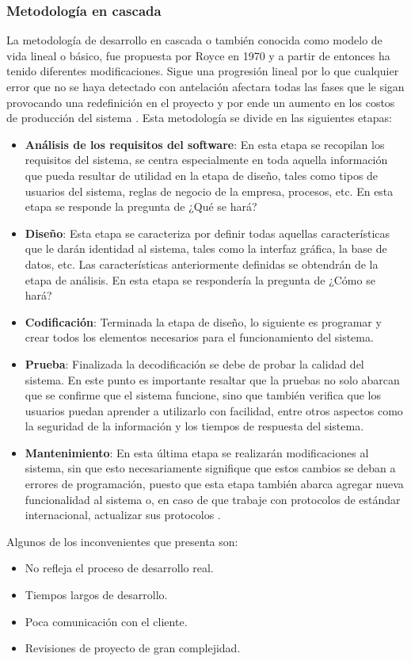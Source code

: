 			\subsubsection{Metodología en cascada}
La metodología de desarrollo en cascada o también conocida como modelo de vida lineal o básico,  fue propuesta por Royce en 1970 y a partir de entonces ha tenido diferentes modificaciones. Sigue una progresión lineal por lo que cualquier error que no se haya detectado con antelación afectara todas las fases que le sigan provocando una redefinición en el proyecto y por ende un aumento en los costos de producción del sistema \cite{Ref:CarCascada}.
Esta metodología se divide en las siguientes etapas:
\begin{itemize}
	\item \textbf{Análisis de los requisitos del software}: En esta etapa se recopilan los requisitos del sistema, se centra especialmente en toda aquella información que pueda resultar de utilidad en la etapa de diseño, tales como tipos de usuarios del sistema, reglas de negocio de la empresa, procesos, etc. En esta etapa se responde la pregunta de ¿Qué se hará? 
	\item \textbf{Diseño}: Esta etapa se caracteriza por definir todas aquellas características que le darán identidad al sistema, tales como la interfaz gráfica, la base de datos, etc. Las características anteriormente definidas se obtendrán de la etapa de análisis. En esta etapa se respondería la pregunta de ¿Cómo se hará? 
	\item \textbf{Codificación}: Terminada la etapa de diseño, lo siguiente es programar y crear todos los elementos necesarios para el funcionamiento del sistema. 
	\item \textbf{Prueba}: Finalizada la decodificación se debe de probar la calidad del sistema. En este punto es importante resaltar que la pruebas no solo abarcan que se confirme que el sistema funcione, sino que también verifica que los usuarios puedan aprender a utilizarlo con facilidad, entre otros aspectos como la seguridad de la información y los tiempos de respuesta del sistema.
	\item \textbf{Mantenimiento}: En esta última etapa se realizarán modificaciones al sistema, sin que esto necesariamente signifique que estos cambios se deban a errores de programación, puesto que esta etapa también abarca agregar nueva funcionalidad al sistema o, en caso de que trabaje con protocolos de estándar internacional, actualizar sus protocolos \cite{Ref:CarCascada}. 
\end{itemize}
Algunos de los inconvenientes que presenta son:
\begin{itemize}
	\item No refleja el proceso de desarrollo real.
	\item Tiempos largos de desarrollo.
	\item Poca comunicación con el cliente.
	\item Revisiones de proyecto de gran complejidad.
\end{itemize}

